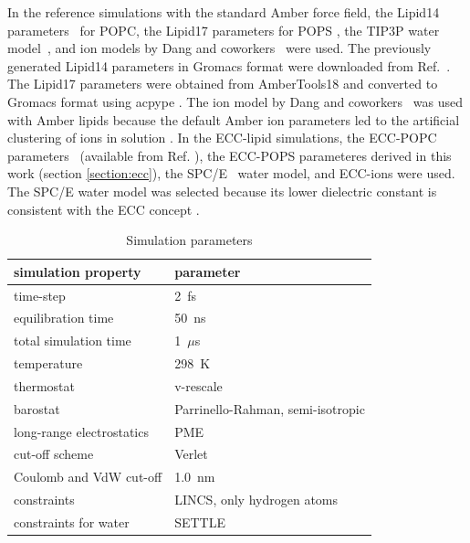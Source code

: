 \documentclass[journal=jpcbfk,manuscript=article]{achemso}
\begin{document}
In the reference simulations with the standard Amber force field,
the Lipid14 parameters~\cite{dickson14} for POPC, the Lipid17 parameters for POPS \cite{lipid17-future},
the TIP3P water model~\cite{jorgensen83}, and ion models by Dang and coworkers~\cite{smith94,chang1999,dang2006} were used.
The previously generated \cite{botan15} Lipid14 parameters in Gromacs format were downloaded from Ref.~. 
The Lipid17 parameters were obtained from AmberTools18 \cite{amber18} 
and converted to Gromacs format using acpype \cite{acpype}.  
The ion model by Dang and coworkers~\cite{smith94,chang1999,dang2006} was used with Amber lipids because
the default Amber ion parameters \cite{aqvist90} led to the artificial clustering of ions in solution \cite{NMRlipidsIV}.
In the ECC-lipid simulations,
the ECC-POPC parameters~\cite{melcr18} (available from Ref. ), 
the ECC-POPS parameteres derived in this work (section \ref{section:ecc}), 
the SPC/E~\cite{Berendsen1987} water model, and ECC-ions \cite{martinek17, kohagen16, Pluharova2014} were used.
The SPC/E water model was selected because its lower dielectric constant is consistent with the
ECC concept \cite{leontyev11,leontyev14}.
\begin{table}[tbp]
  \caption{Simulation parameters}
  \label{tbl:mdpar}
  \begin{tabular}{ll}
    simulation property & parameter   \\
    \hline
    time-step           & 2~fs         \\
    equilibration time  & 50~ns  \\
    total simulation time     & 1~$\mu$s  \\
    temperature         & 298~K       \\
    thermostat          & v-rescale  \cite{bussi07}   \\
    barostat            & Parrinello-Rahman, semi-isotropic \cite{parrinello81} \\
    long-range electrostatics & PME  \cite{darden93}  \\
    cut-off scheme      & Verlet \cite{Pall13}      \\
    Coulomb and VdW cut-off & 1.0~nm \\
    constraints         & LINCS, only hydrogen atoms \cite{hess97} \\
    constraints for water & SETTLE  \cite{miyamoto92} \\
    \hline
  \end{tabular}
\end{table}
 
\end{document}
